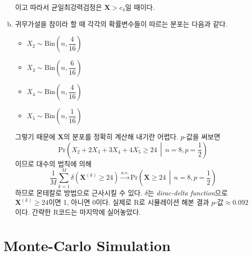 \documentclass[answers]{exam}
\begin{document}
\begin{questions}
\begin{solution}
\begin{enumerate}[(a)]
      이고 따라서 균일최강력검정은 $\mathbf{X}>c_{4}$일 때이다.
      \item 귀무가설을 참이라 할 때 각각의 확률변수들이 따르는 분포는 다음과 같다.
      \begin{itemize}
        \item $X_{2}\sim \mathrm{Bin}\left(n,\dfrac{4}{16}\right)$
        \item $X_{3}\sim \mathrm{Bin}\left(n,\dfrac{6}{16}\right)$
        \item $X_{4}\sim \mathrm{Bin}\left(n,\dfrac{4}{16}\right)$
        \item $X_{5}\sim \mathrm{Bin}\left(n,\dfrac{1}{16}\right)$
      \end{itemize}
      그렇기 때문에 $\mathbf{X}$의 분포를 정확히 계산해 내기란 어렵다. $p$-값을 써보면
      \begin{equation}
        \mathrm{Pr}\left(X_{2}+2X_{3}+3X_{4}+4X_{5}\geq 24\,\middle|\,n=8,p=\dfrac{1}{2}\right)
      \end{equation}
      이므로 대수의 법칙에 의해
      \begin{equation}
        \dfrac{1}{M}\sum_{k=1}^{M}\delta\left(\mathbf{X}^{\left(k\right)}\geq 24\right) \xrightarrow{a.s.} \mathrm{Pr}\left(\mathbf{X}\geq 24\,\middle|\,n=8,p=\dfrac{1}{2}\right)
      \end{equation}
      하므로 몬테칼로 방법으로 근사시킬 수 있다. $\delta$는 \emph{dirac-delta function}으로 $\mathbf{X}^{\left(k\right)}\geq 24$이면 1, 아니면 0이다. 실제로 \textsf{R}로 시뮬레이션 해본 결과 $p$-값$\approx 0.092$이다. 간략한 \textsf{R}코드는 마지막에 실어놓았다.
    \end{enumerate}
   \end{solution}
\end{questions}
\newpage
\appendix
\section{Monte-Carlo Simulation}

\end{document}
